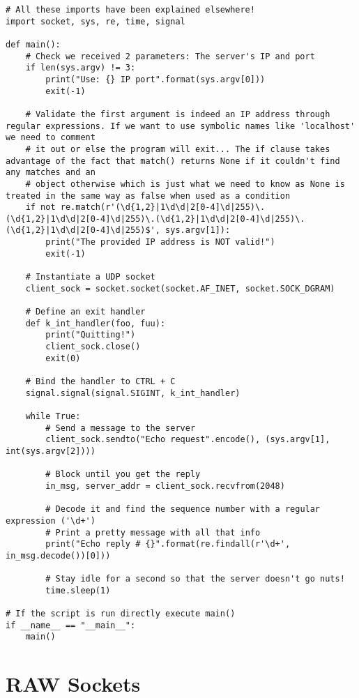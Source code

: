 \documentclass[landscape]{article}
\begin{document}
                \begin{verbatim}
# All these imports have been explained elsewhere!
import socket, sys, re, time, signal

def main():
    # Check we received 2 parameters: The server's IP and port
    if len(sys.argv) != 3:
        print("Use: {} IP port".format(sys.argv[0]))
        exit(-1)

    # Validate the first argument is indeed an IP address through regular expressions. If we want to use symbolic names like 'localhost' we need to comment
    # it out or else the program will exit... The if clause takes advantage of the fact that match() returns None if it couldn't find any matches and an
    # object otherwise which is just what we need to know as None is treated in the same way as false when used as a condition
    if not re.match(r'(\d{1,2}|1\d\d|2[0-4]\d|255)\.(\d{1,2}|1\d\d|2[0-4]\d|255)\.(\d{1,2}|1\d\d|2[0-4]\d|255)\.(\d{1,2}|1\d\d|2[0-4]\d|255)$', sys.argv[1]):
        print("The provided IP address is NOT valid!")
        exit(-1)

    # Instantiate a UDP socket
    client_sock = socket.socket(socket.AF_INET, socket.SOCK_DGRAM)

    # Define an exit handler
    def k_int_handler(foo, fuu):
        print("Quitting!")
        client_sock.close()
        exit(0)

    # Bind the handler to CTRL + C
    signal.signal(signal.SIGINT, k_int_handler)

    while True:
        # Send a message to the server
        client_sock.sendto("Echo request".encode(), (sys.argv[1], int(sys.argv[2])))

        # Block until you get the reply
        in_msg, server_addr = client_sock.recvfrom(2048)

        # Decode it and find the sequence number with a regular expression ('\d+')
        # Print a pretty message with all that info
        print("Echo reply # {}".format(re.findall(r'\d+', in_msg.decode())[0]))

        # Stay idle for a second so that the server doesn't go nuts!
        time.sleep(1)

# If the script is run directly execute main()
if __name__ == "__main__":
    main()
                \end{verbatim}

    \section{RAW Sockets}
\end{document}
